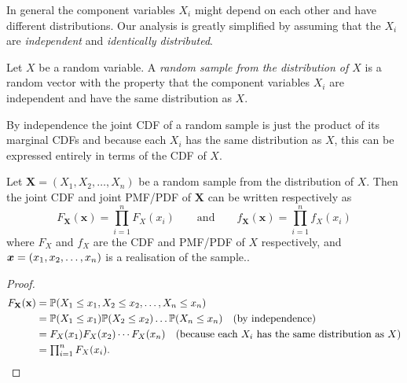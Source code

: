 In general the component variables $X_i$ might depend on each other and have different distributions. Our analysis is greatly simplified by assuming that the $X_i$ are \emph{independent} and \emph{identically distributed}.%

\begin{definition}\label{def:random_sample}
Let $X$ be a random variable. A \emph{random sample from the distribution of $X$} is a random vector with the property that the component variables $X_i$ are independent and have the same distribution as $X$.
\end{definition}

By independence the joint CDF of a random sample is just the product of its marginal CDFs and because each $X_i$ has the same distribution as $X$, this can be expressed entirely in terms of the CDF of $X$.
 
\begin{lemma}
Let $\mathbf{X}=(X_1,X_2,\ldots,X_n)$ be a random sample from the distribution of $X$. Then the joint CDF and joint PMF/PDF of $\mathbf{X}$ can be written respectively as
\[
F_{\mathbf{X}}(\mathbf{x}) = \textstyle\prod_{i=1}^n F_X(x_i) 
\qquad\text{and}\qquad
f_{\mathbf{X}}(\mathbf{x}) = \textstyle\prod_{i=1}^n f_X(x_i)
\]
where $F_X$ and $f_X$ are the CDF and PMF/PDF of $X$ respectively, and $\boldsymbol{x}=(x_1,x_2,\ldots,x_n)$ is a realisation of the sample.. 
\end{lemma}
\begin{proof}
\begin{align*}
F_{\mathbf{X}}(\mathbf{x})
	& = \mathbb{P}(X_1\leq x_1, X_2\leq x_2, \ldots, X_n\leq x_n) \\
	& = \mathbb{P}(X_1\leq x_1)\mathbb{P}(X_2\leq x_2)\ldots\mathbb{P}(X_n\leq x_n) \quad\text{(by independence)} \\
	& = F_X(x_1)F_X(x_2)\cdots F_X(x_n) \quad\text{(because each $X_i$ has the same distribution as $X$)}\\
	& = \textstyle\prod_{i=1}^n F_X(x_i).
\end{align*}
\end{proof}

